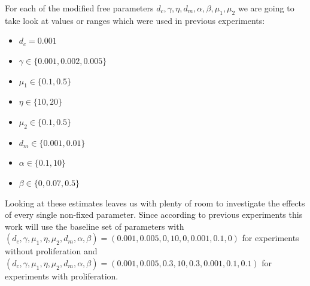 For each of the modified free parameters $d_c, \gamma, \eta, d_m, \alpha, \beta, \mu_1, \mu_2$ we are going to take look at values or ranges which were used in previous experiments: 
\begin{itemize}
    \item $d_c = 0.001$
    \item $\gamma \in \{0.001, 0.002, 0.005\}$
    \item $\mu_1 \in \{0.1, 0.5\}$
    \item $\eta \in \{10, 20\}$
    \item $\mu_2 \in \{0.1, 0.5\}$
    \item $d_m \in \{0.001, 0.01\}$
    \item $\alpha \in \{0.1, 10\}$
    \item $\beta \in \{0, 0.07, 0.5\}$
\end{itemize}
Looking at these estimates leaves us with plenty of room to investigate the effects of every single non-fixed parameter. Since according to previous experiments this work will use the baseline set of parameters with $(d_c, \gamma, \mu_1, \eta, \mu_2, d_m, \alpha, \beta) = (0.001, 0.005, 0, 10, 0, 0.001,0.1, 0)$ for experiments without proliferation and 
$(d_c, \gamma, \mu_1, \eta, \mu_2, d_m, \alpha, \beta) = (0.001, 0.005, 0.3, 10, 0.3, 0.001,0.1, 0.1)$ for experiments with proliferation.

